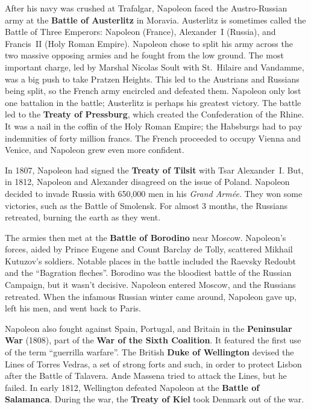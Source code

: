 After his navy was crushed at Trafalgar,
Napoleon faced the Austro-Russian army at the \textbf{Battle of Austerlitz} in Moravia.
Austerlitz is sometimes called the Battle of Three Emperors:
Napoleon (France), Alexander~I (Russia), and Francis~II (Holy Roman Empire).
Napoleon chose to split his army across the two massive opposing armies
and he fought from the low ground.
The most important charge, led by Marshal Nicolas Soult with St.\ Hilaire and Vandamme,
was a big push to take Pratzen Heights.
This led to the Austrians and Russians being split, so the French army encircled and defeated them.
Napoleon only lost one battalion in the battle; Austerlitz is perhaps his greatest victory.
The battle led to the \textbf{Treaty of Pressburg}, which created the Confederation of the Rhine.
It was a nail in the coffin of the Holy Roman Empire;
the Habsburgs had to pay indemnities of forty million francs.
The French proceeded to occupy Vienna and Venice, and Napoleon grew even more confident.

In 1807, Napoleon had signed the \textbf{Treaty of Tilsit} with Tsar Alexander~I.
But, in 1812, Napoleon and Alexander disagreed on the issue of Poland.
Napoleon decided to invade Russia with 650,000 men in his \textit{Grand Arm\'ee}.
They won some victories, such as the Battle of Smolensk.
For almost 3 months, the Russians retreated, burning the earth as they went.

The armies then met at the \textbf{Battle of Borodino} near Moscow.
Napoleon's forces, aided by Prince Eugene and Count Barclay de Tolly,
scattered Mikhail Kutuzov's soldiers.
Notable places in the battle included the Raevsky Redoubt and the ``Bagration fleches''.
Borodino was the bloodiest battle of the Russian Campaign, but it wasn't decisive.
Napoleon entered Moscow, and the Russians retreated.
When the infamous Russian winter came around,
Napoleon gave up, left his men, and went back to Paris.

Napoleon also fought against Spain, Portugal, and Britain in the \textbf{Peninsular War} (1808),
part of the \textbf{War of the Sixth Coalition}.
It featured the first use of the term ``guerrilla warfare''.
The British \textbf{Duke of Wellington} devised the Lines of Torres Vedras,
a set of strong forts and such,
in order to protect Lisbon after the Battle of Talavera.
Ande Massena tried to attack the Lines, but he failed.
In early 1812, Wellington defeated Napoleon at the \textbf{Battle of Salamanca}.
During the war, the \textbf{Treaty of Kiel} took Denmark out of the war.


